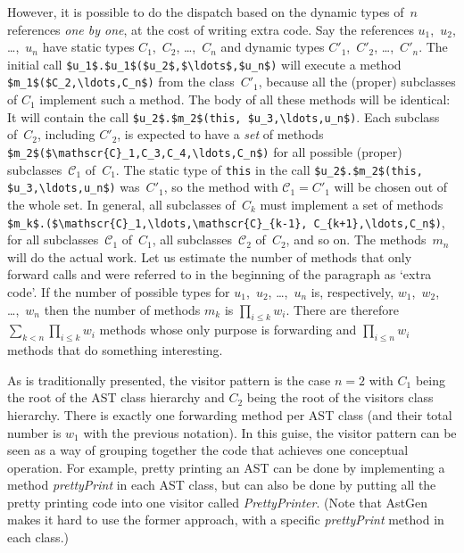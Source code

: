 \documentclass{llncs}
\newcommand{\jmlCode}{\lstinline[style=jml,basicstyle=\normalsize]}
\begin{document}
However, it is possible to do the dispatch based on the
dynamic types of~$n$ references \emph{one by one}, at the
cost of writing extra code. Say the references $u_1$,~$u_2$,
\dots,~$u_n$ have static types $C_1$,~$C_2$, \dots,~$C_n$ and
dynamic types $C'_1$,~$C'_2$, \dots,~$C'_n$. The initial call
\jmlCode|$u_1$.$u_1$($u_2$,$\ldots$,$u_n$)| will execute a method
\jmlCode|$m_1$($C_2,\ldots,C_n$)| from the class~$C'_1$, because
all the (proper) subclasses of $C_1$ implement such a method. The
body of all these methods will be identical: It will contain the
call \jmlCode|$u_2$.$m_2$(this, $u_3,\ldots,u_n$)|. Each subclass
of~$C_2$, including $C'_2$, is expected to have a \emph{set}
of methods \jmlCode|$m_2$($\mathscr{C}_1,C_3,C_4,\ldots,C_n$)|
for all possible (proper) subclasses~$\mathscr{C}_1$
of~$C_1$. The static type of \jmlCode|this| in the call
\jmlCode|$u_2$.$m_2$(this, $u_3,\ldots,u_n$)| was~$C'_1$, so the
method with $\mathscr{C}_1=C'_1$ will be chosen out of the whole
set. In general, all subclasses of~$C_k$ must implement a set of
methods \jmlCode|$m_k$.($\mathscr{C}_1,\ldots,\mathscr{C}_{k-1},
C_{k+1},\ldots,C_n$)|, for all subclasses~$\mathscr{C}_1$
of~$C_1$, all subclasses~$\mathscr{C}_2$ of~$C_2$, and so on. The
methods~$m_n$ will do the actual work. Let us estimate the number
of methods that only forward calls and were referred to in the
beginning of the paragraph as `extra code'. If the number of
possible types for $u_1$,~$u_2$, \dots,~$u_n$ is, respectively,
$w_1$,~$w_2$, \dots,~$w_n$ then the number of methods $m_k$ is
$\prod_{i\le k} w_i$. There are therefore $\sum_{k<n}\prod_{i\le
k} w_i$ methods whose only purpose is forwarding and $\prod_{i\le
n} w_i$ methods that do something interesting.

As is traditionally presented, the visitor pattern is the case
$n=2$ with $C_1$ being the root of the AST class hierarchy and
$C_2$ being the root of the visitors class hierarchy. There is
exactly one forwarding method per AST class (and their total
number is $w_1$ with the previous notation). In this guise,
the visitor pattern can be seen as a way of grouping together
the code that achieves one conceptual operation. For example,
pretty printing an AST can be done by implementing a method
\textit{prettyPrint} in each AST class, but can also be done by
putting all the pretty printing code into one visitor called
\textit{PrettyPrinter}. (Note that AstGen makes it hard to use
the former approach, with a specific \textit{prettyPrint} method
in each class.)

\end{document}
